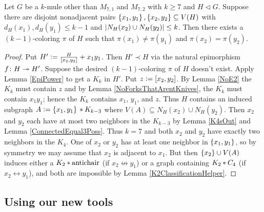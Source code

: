 \begin{lem}\label{ToolTwo}
Let $G$ be a $k$-mule other than $M_{7,1}$ and $M_{7,2}$ with $k \geq 7$ and $H
\lhd G$.  Suppose there are disjoint nonadjacent pairs $\left\{ x_1, y_1 \right\},
\left\{ x_2, y_2 \right\} \subseteq V(H)$ with $d_H(x_1), d_H(y_1) \leq k - 1$ and $\left|N_H(x_2)
\cup N_H(y_2)\right| \leq k$. Then there exists a $(k - 1)$-coloring $\pi$ of $H$
such that $\pi(x_1) \neq \pi(y_1)$ and $\pi(x_2) = \pi(y_2)$.
\end{lem}
\begin{proof}
Put $H' \mathrel{\mathop:}= \frac{H}{\left[ x_2, y_2 \right]} + x_1y_1$.  Then
$H' \prec H$ via the natural epimorphism $f\colon H \twoheadrightarrow H'$.  
Suppose the desired $(k - 1)$-coloring $\pi$ of $H$ doesn't exist. 
Apply Lemma \ref{EpiPower} to get a $K_k$ in $H'$. Put $z \mathrel{\mathop:}=
\left[ x_2, y_2 \right]$.  By Lemma \ref{NoE2} the $K_k$ must contain $z$ and by
Lemma \ref{NoForksThatArentKnives}, the $K_k$ must contain $x_1y_1$; hence
the $K_k$ contains $x_1$, $y_1$, and $z$.  Thus
$H$ contains an induced subgraph $A \mathrel{\mathop:}= \left\{ x_1, y_1 \right\} \mbox{\hspace{2 pt}$\ast$\hspace{2 pt}} K_{k-3}$
where $V(A) \subseteq N_H(x_2) \cup N_H(y_2)$.  Then $x_2$ and $y_2$ each have at most
two neighbors in the $K_{k-3}$ by Lemma \ref{K4sOut} and Lemma
\ref{ConnectedEqual3Poss}.  Thus $k=7$ and both $x_2$ and $y_2$ have exactly
two neighbors in the $K_4$.  One of $x_2$ or $y_2$ has at least one neighbor in
$\left\{ x_1, y_1 \right\}$, so by symmetry we may assume that $x_2$ is adjacent to $x_1$. 
But then $\left\{ x_2 \right\} \cup V(A)$ induces either a $K_2 \mbox{\hspace{2 pt}$\ast$\hspace{2 pt}} \text{antichair}$ (if
$x_2\not\leftrightarrow y_1$) or a graph containing $K_2 \mbox{\hspace{2 pt}$\ast$\hspace{2 pt}} C_4$ (if
$x_2\leftrightarrow y_1$), and both are impossible by Lemma
\ref{K2ClassificationHelper}.
\end{proof}

\subsection{Using our new tools}



